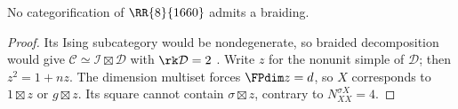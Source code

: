 \begin{corollary}\label{cor:1660-no-braiding}
No categorification of $\RR{8}{1660}$ admits a braiding.
\end{corollary}
\begin{proof}
Its Ising subcategory would be nondegenerate, so braided decomposition
would give $\mathcal C\simeq\mathcal I\boxtimes\mathcal D$ with
$\rk\mathcal D=2$ \cite[Corollary~B.12 and Theorem~3.13]{DGNO}.
Write $z$ for the nonunit simple of $\mathcal D$; then
$z^2=1+nz$. The dimension multiset forces $\FPdim z=d$, so
$X$ corresponds to $1\boxtimes z$ or $g\boxtimes z$.
Its square cannot contain $\sigma\boxtimes z$, contrary to
$N_{XX}^{\sigma X}=4$.
\end{proof}

